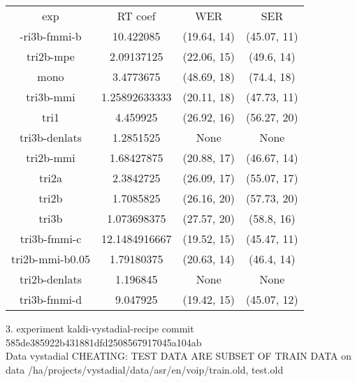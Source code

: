 \begin{tabular}{cccc}
exp             & RT coef       & WER         & SER        \\
-ri3b-fmmi-b    & 10.422085     & (19.64, 14) & (45.07, 11)\\
tri2b-mpe       & 2.09137125    & (22.06, 15) & (49.6, 14) \\
mono            & 3.4773675     & (48.69, 18) & (74.4, 18) \\
tri3b-mmi       & 1.25892633333 & (20.11, 18) & (47.73, 11)\\
tri1            & 4.459925      & (26.92, 16) & (56.27, 20)\\
tri3b-denlats   & 1.2851525     & None        & None       \\
tri2b-mmi       & 1.68427875    & (20.88, 17) & (46.67, 14)\\
tri2a           & 2.3842725     & (26.09, 17) & (55.07, 17)\\
tri2b           & 1.7085825     & (26.16, 20) & (57.73, 20)\\
tri3b           & 1.073698375   & (27.57, 20) & (58.8, 16) \\
tri3b-fmmi-c    & 12.1484916667 & (19.52, 15) & (45.47, 11)\\
tri2b-mmi-b0.05 & 1.79180375    & (20.63, 14) & (46.4, 14) \\
tri2b-denlats   & 1.196845      & None        & None       \\
tri3b-fmmi-d    & 9.047925      & (19.42, 15) & (45.07, 12)
\end{tabular}


3. experiment kaldi-vystadial-recipe commit 585de385922b431881dfd2508567917045a104ab\\
Data vystadial
CHEATING: TEST DATA ARE SUBSET OF TRAIN DATA
on data /ha/projects/vystadial/data/asr/en/voip/{train.old, test.old}


